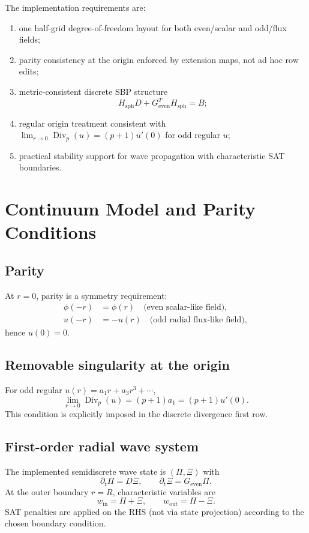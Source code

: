 \documentclass[
  aps,
  pre,
  reprint,
  superscriptaddress,
  nofootinbib
]{revtex4-2}
\newcommand{\Divp}{\operatorname{Div}_{p}}
\newcommand{\Ge}{G_{\mathrm{even}}}
\newcommand{\Hs}{H_{\mathrm{sph}}}
\begin{document}
The implementation requirements are:
\begin{enumerate}
  \item one half-grid degree-of-freedom layout for both even/scalar and odd/flux fields;
  \item parity consistency at the origin enforced by extension maps, not ad hoc row edits;
  \item metric-consistent discrete SBP structure
  \begin{equation}
    \Hs D + \Ge^{T}\Hs = B;
  \end{equation}
  \item regular origin treatment consistent with
  $\lim_{r\to 0}\Divp(u)=(p+1)u'(0)$ for odd regular $u$;
  \item practical stability support for wave propagation with characteristic SAT
  boundaries.
\end{enumerate}

\section{Continuum Model and Parity Conditions}
\subsection{Parity}
At $r=0$, parity is a symmetry requirement:
\begin{align}
\phi(-r) &= \phi(r) \quad \text{(even scalar-like field)},\\
u(-r) &= -u(r) \quad \text{(odd radial flux-like field)},
\end{align}
hence $u(0)=0$.

\subsection{Removable singularity at the origin}
For odd regular $u(r)=a_1r+a_3r^3+\cdots$,
\begin{equation}
\lim_{r\to0}\Divp(u)=(p+1)a_1=(p+1)u'(0).
\end{equation}
This condition is explicitly imposed in the discrete divergence first row.

\subsection{First-order radial wave system}
The implemented semidiscrete wave state is $(\Pi,\Xi)$ with
\begin{equation}
\partial_t\Pi = D\Xi,\qquad
\partial_t\Xi = \Ge\Pi.
\end{equation}
At the outer boundary $r=R$, characteristic variables are
\begin{equation}
w_{\mathrm{in}}=\Pi+\Xi,\qquad w_{\mathrm{out}}=\Pi-\Xi.
\end{equation}
SAT penalties are applied on the RHS (not via state projection) according to the chosen
boundary condition.
\end{document}
